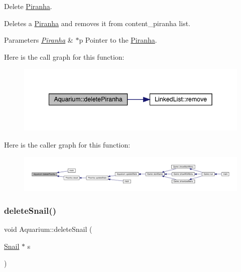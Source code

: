 Delete \mbox{\hyperlink{class_piranha}{Piranha}}. 

Deletes a \mbox{\hyperlink{class_piranha}{Piranha}} and removes it from content\+\_\+piranha list. 
\begin{DoxyParams}{Parameters}
{\em \mbox{\hyperlink{class_piranha}{Piranha}}} & $\ast$p Pointer to the \mbox{\hyperlink{class_piranha}{Piranha}}. \\
\hline
\end{DoxyParams}
Here is the call graph for this function\+:\nopagebreak
\begin{figure}[H]
\begin{center}
\leavevmode
\includegraphics[width=342pt]{class_aquarium_a86cec76f7e0cbbdff79d5cef1e6e7f84_cgraph}
\end{center}
\end{figure}
Here is the caller graph for this function\+:
\nopagebreak
\begin{figure}[H]
\begin{center}
\leavevmode
\includegraphics[width=350pt]{class_aquarium_a86cec76f7e0cbbdff79d5cef1e6e7f84_icgraph}
\end{center}
\end{figure}
\mbox{\label{class_aquarium_a08048866266aabb12b8cc82bac042c18}} 
\subsubsection{\texorpdfstring{delete\+Snail()}{deleteSnail()}}
{\footnotesize\ttfamily void Aquarium\+::delete\+Snail (\begin{DoxyParamCaption}\item[{\mbox{\hyperlink{class_snail}{Snail}} $\ast$}]{s }\end{DoxyParamCaption})}



